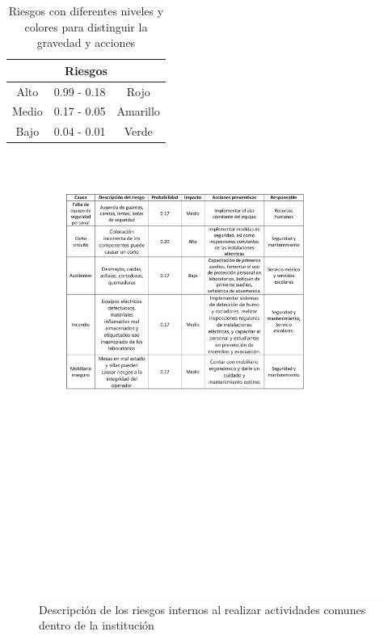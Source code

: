     \begin{table}[h]
        \centering
        \caption{Riesgos con diferentes niveles y colores para distinguir la gravedad y acciones}
        \begin{tabular}{c c c}
        \hline
        \multicolumn{3}{c}{\textbf{Riesgos}}\\
        \hline
             Alto& 0.99 - 0.18 & Rojo  \\
        \hline
             Medio& 0.17 - 0.05 & Amarillo  \\
        \hline
             Bajo& 0.04 - 0.01 & Verde \\
        \hline     
        \end{tabular}
        \label{tab:riego}
    \end{table}
    
    \begin{figure}[H]
        \centering
        \includegraphics[trim = {1mm 120mm 1mm 1mm},clip,scale=0.45]{34/img/riesgoInternoActividadesComunes.pdf}
        \caption{Descripción de los riesgos internos al realizar actividades comunes dentro de la institución}
        \label{fig:enter-label10}
    \end{figure}
     
